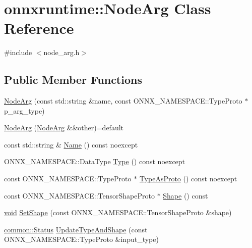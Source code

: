 \hypertarget{classonnxruntime_1_1NodeArg}{}\section{onnxruntime\+:\+:Node\+Arg Class Reference}
\label{classonnxruntime_1_1NodeArg}


{\ttfamily \#include $<$node\+\_\+arg.\+h$>$}

\subsection*{Public Member Functions}
\begin{DoxyCompactItemize}
\item 
\mbox{\hyperlink{classonnxruntime_1_1NodeArg_a44f519c9e037ea2f7530e6e7c547dc0a}{Node\+Arg}} (const std\+::string \&name, const O\+N\+N\+X\+\_\+\+N\+A\+M\+E\+S\+P\+A\+C\+E\+::\+Type\+Proto $\ast$p\+\_\+arg\+\_\+type)
\item 
\mbox{\hyperlink{classonnxruntime_1_1NodeArg_a42fe9c1fd822d43315ae652c1778d198}{Node\+Arg}} (\mbox{\hyperlink{classonnxruntime_1_1NodeArg}{Node\+Arg}} \&\&other)=default
\item 
const std\+::string \& \mbox{\hyperlink{classonnxruntime_1_1NodeArg_a62c3405e01502623320ff8f2f2d8b135}{Name}} () const noexcept
\item 
O\+N\+N\+X\+\_\+\+N\+A\+M\+E\+S\+P\+A\+C\+E\+::\+Data\+Type \mbox{\hyperlink{classonnxruntime_1_1NodeArg_a58dbbe165f4f835a20f4687fd2d165d9}{Type}} () const noexcept
\item 
const O\+N\+N\+X\+\_\+\+N\+A\+M\+E\+S\+P\+A\+C\+E\+::\+Type\+Proto $\ast$ \mbox{\hyperlink{classonnxruntime_1_1NodeArg_a23e96b022bdb93ea9169cbcd292d7c87}{Type\+As\+Proto}} () const noexcept
\item 
const O\+N\+N\+X\+\_\+\+N\+A\+M\+E\+S\+P\+A\+C\+E\+::\+Tensor\+Shape\+Proto $\ast$ \mbox{\hyperlink{classonnxruntime_1_1NodeArg_a923de298e44cb0620c0e4b5c7c7c88e4}{Shape}} () const
\item 
\mbox{\hyperlink{mlasi_8h_a88f941d423cb2a819b70a1358982b1a6}{void}} \mbox{\hyperlink{classonnxruntime_1_1NodeArg_ab39c6f852b796c2db48ed0af0feb5784}{Set\+Shape}} (const O\+N\+N\+X\+\_\+\+N\+A\+M\+E\+S\+P\+A\+C\+E\+::\+Tensor\+Shape\+Proto \&shape)
\item 
\mbox{\hyperlink{classonnxruntime_1_1common_1_1Status}{common\+::\+Status}} \mbox{\hyperlink{classonnxruntime_1_1NodeArg_ab11045bc6bf9aa0a33a8195a2a31892b}{Update\+Type\+And\+Shape}} (const O\+N\+N\+X\+\_\+\+N\+A\+M\+E\+S\+P\+A\+C\+E\+::\+Type\+Proto \&input\+\_\+type)

\end{DoxyCompactItemize}
